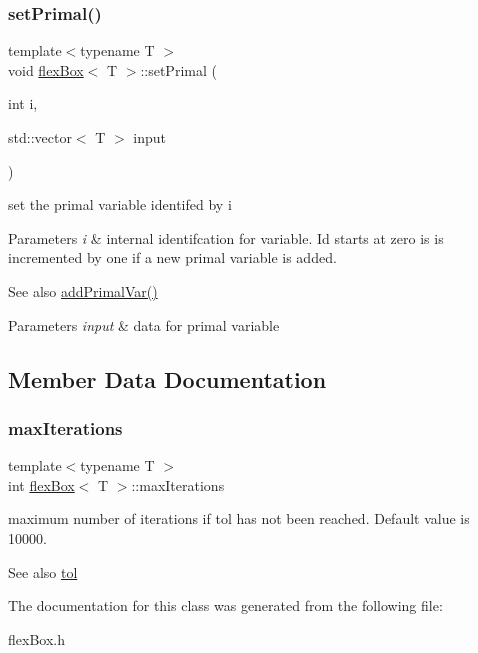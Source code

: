 \subsubsection{\texorpdfstring{set\+Primal()}{setPrimal()}}
{\footnotesize\ttfamily template$<$typename T $>$ \\
void \hyperlink{classflex_box}{flex\+Box}$<$ T $>$\+::set\+Primal (\begin{DoxyParamCaption}\item[{int}]{i,  }\item[{std\+::vector$<$ T $>$}]{input }\end{DoxyParamCaption})\hspace{0.3cm}{\ttfamily [inline]}}



set the primal variable identifed by i 


\begin{DoxyParams}{Parameters}
{\em i} & internal identifcation for variable. Id starts at zero is is incremented by one if a new primal variable is added. \\
\hline
\end{DoxyParams}
\begin{DoxySeeAlso}{See also}
\hyperlink{classflex_box_a659aac107b85ecf64c9fd1aaa465a98d}{add\+Primal\+Var()} 
\end{DoxySeeAlso}

\begin{DoxyParams}{Parameters}
{\em input} & data for primal variable \\
\hline
\end{DoxyParams}


\subsection{Member Data Documentation}
\mbox{\label{classflex_box_aa20a8abc40427d7a4b8c709f1e38318d}} 
\subsubsection{\texorpdfstring{max\+Iterations}{maxIterations}}
{\footnotesize\ttfamily template$<$typename T $>$ \\
int \hyperlink{classflex_box}{flex\+Box}$<$ T $>$\+::max\+Iterations}



maximum number of iterations if tol has not been reached. Default value is 10000. 

\begin{DoxySeeAlso}{See also}
\hyperlink{classflex_box_acd4f987e22eb761cff9f6c98592808b4}{tol} 
\end{DoxySeeAlso}


The documentation for this class was generated from the following file\+:\begin{DoxyCompactItemize}
\item 
flex\+Box.\+h\end{DoxyCompactItemize}
